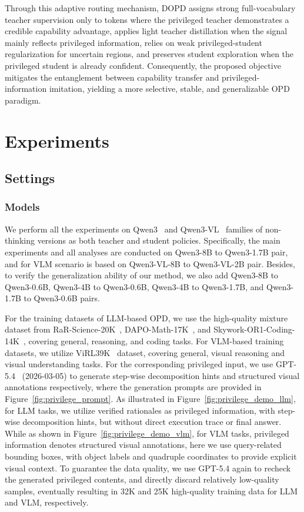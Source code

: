 \documentclass[]{jingdong}
\theoremstyle{plain}
\theoremstyle{definition}
\theoremstyle{remark}
\begin{document}
Through this adaptive routing mechanism, DOPD assigns strong full-vocabulary teacher supervision only to tokens where the privileged teacher demonstrates a credible capability advantage, applies light teacher distillation when the signal mainly reflects privileged information, relies on weak privileged-student regularization for uncertain regions, and preserves student exploration when the privileged student is already confident. 
Consequently, the proposed objective mitigates the entanglement between capability transfer and privileged-information imitation, yielding a more selective, stable, and generalizable OPD paradigm.




\section{Experiments}
\subsection{Settings}
\subsubsection{Models}
We perform all the experiments on Qwen3~\citep{yang2025qwen3} and Qwen3-VL~\citep{bai2025qwen3} families of non-thinking versions as both teacher and student policies. Specifically, the main experiments and all analyses are conducted on Qwen3-8B to Qwen3-1.7B pair, and for VLM scenario is based on Qwen3-VL-8B to Qwen3-VL-2B pair. Besides, to verify the generalization ability of our method, we also add Qwen3-8B to Qwen3-0.6B, Qwen3-4B to Qwen3-0.6B, Qwen3-4B to Qwen3-1.7B, and Qwen3-1.7B to Qwen3-0.6B pairs. 


For the training datasets of LLM-based OPD, we use the high-quality mixture dataset from RaR-Science-20K~\citep{gunjal2025rubrics}, DAPO-Math-17K~\citep{yu2026dapo}, and Skywork-OR1-Coding-14K~\citep{he2025skywork}, covering general, reasoning, and coding tasks. For VLM-based training datasets, we utilize ViRL39K~\citep{li2026lavida} dataset, covering general, visual reasoning and visual understanding tasks. For the corresponding privileged input, we use GPT-5.4~\citep{gpt54} (2026-03-05) to generate step-wise decomposition hints and structured visual annotations respectively, where the generation prompts are provided in Figure~\ref{fig:privilege_prompt}.
As illustrated in Figure~\ref{fig:privilege_demo_llm}, for LLM tasks, we utilize verified rationales as privileged information, with step-wise decomposition hints, but without direct execution trace or final answer.
While as shown in Figure~\ref{fig:privilege_demo_vlm}, for VLM tasks, privileged information denotes structured visual annotations, here we use query-related bounding boxes, with object labels and quadruple coordinates to provide explicit visual context.
To guarantee the data quality, we use GPT-5.4 again to recheck the generated privileged contents, and directly discard relatively low-quality samples, eventually resulting in 32K and 25K high-quality training data for LLM and VLM, respectively.  
\end{document}
